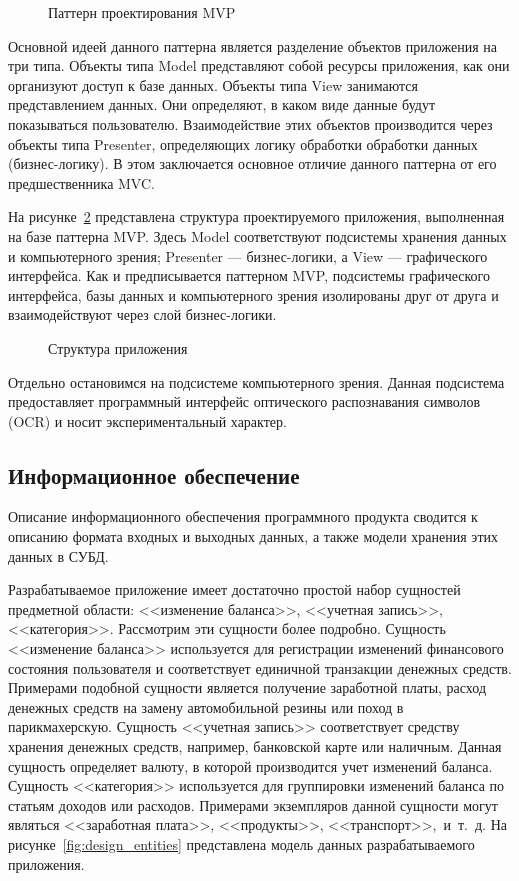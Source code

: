 \begin{figure}[h!]
  \centering
  \caption{Паттерн проектирования MVP}
  \label{fig:design_mvp}
\end{figure}

Основной идеей данного паттерна является разделение объектов приложения на три типа.
Объекты типа Model представляют собой ресурсы приложения, как они организуют доступ
к базе данных. Объекты типа View занимаются представлением данных. Они определяют,
в каком виде данные будут показываться пользователю. Взаимодействие этих объектов
производится через объекты типа Presenter, определяющих логику обработки
обработки данных (бизнес-логику). В этом заключается основное отличие данного паттерна от
его предшественника MVC.

На рисунке~\ref{fig:design_main} представлена структура проектируемого приложения,
выполненная на базе паттерна MVP.
Здесь Model соответствуют подсистемы хранения данных и компьютерного зрения;
Presenter --- бизнес-логики, а View --- графического интерфейса.
Как и предписывается паттерном MVP, подсистемы графического интерфейса,
базы данных и компьютерного зрения изолированы друг от друга и взаимодействуют
через слой бизнес-логики.

\begin{figure}[h!]
  \centering
  \caption{Структура приложения}
  \label{fig:design_main}
\end{figure}

Отдельно остановимся на подсистеме компьютерного зрения.
Данная подсистема предоставляет программный интерфейс оптического распознавания
символов (OCR) и носит экспериментальный характер.

\subsection{Информационное обеспечение}

Описание информационного обеспечения программного продукта сводится
к описанию формата входных и выходных данных, а также модели хранения
этих данных в СУБД.

Разрабатываемое приложение имеет достаточно простой набор сущностей
предметной области: <<изменение баланса>>, <<учетная запись>>, <<категория>>.
Рассмотрим эти сущности более подробно.
Сущность <<изменение баланса>> используется для регистрации изменений
финансового состояния пользователя и соответствует единичной транзакции
денежных средств.
Примерами подобной сущности является получение заработной платы,
расход денежных средств на замену автомобильной резины или поход в
парикмахерскую.
Сущность <<учетная запись>> соответствует средству хранения денежных
средств, например, банковской карте или наличным.
Данная сущность определяет валюту, в которой производится учет изменений
баланса.
Сущность <<категория>> используется для группировки изменений баланса
по статьям доходов или расходов. Примерами экземпляров данной сущности
могут являться <<заработная плата>>, <<продукты>>, <<транспорт>>,~и~т.~д.
На рисунке~\ref{fig:design_entities} представлена модель данных
разрабатываемого приложения.

